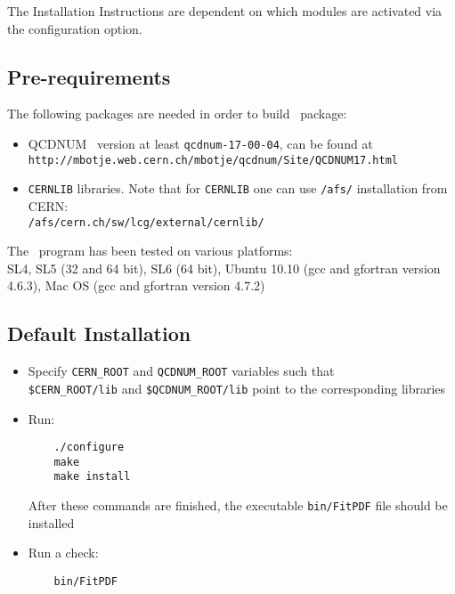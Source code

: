 
\label{sec:install}

The Installation Instructions are dependent on which modules are activated via the configuration option. 
\subsection{Pre-requirements}

The following packages are needed in order to build \fitter\ package:
\begin{itemize}
\item QCDNUM~\cite{qcdnum} version at least {\tt qcdnum-17-00-04}, can be found at \\
  {\tt http://mbotje.web.cern.ch/mbotje/qcdnum/Site/QCDNUM17.html}
\item {\tt CERNLIB} libraries. Note that for {\tt CERNLIB} one can use {\tt /afs/} installation from CERN:\\
  {\tt /afs/cern.ch/sw/lcg/external/cernlib/}
\end{itemize}
The \fitter\ program has been tested on various platforms:\\
SL4, SL5 (32 and 64 bit), SL6 (64 bit),  Ubuntu 10.10 (gcc and gfortran version 4.6.3), Mac OS (gcc and gfortran version 4.7.2) 

\subsection{Default Installation}
\begin{itemize}
\item
 Specify {\tt CERN\_ROOT} 
     and {\tt QCDNUM\_ROOT} variables such that\\
     \verb'$CERN_ROOT/lib'  and \verb'$QCDNUM_ROOT/lib'
 point to the corresponding libraries
\item Run:
\begin{verbatim}
    ./configure
    make 
    make install
\end{verbatim}
After these commands are finished, the executable {\tt bin/FitPDF} 
file should be installed
\item  Run a check:
\begin{verbatim}
    bin/FitPDF 
\end{verbatim}
\end{itemize}

